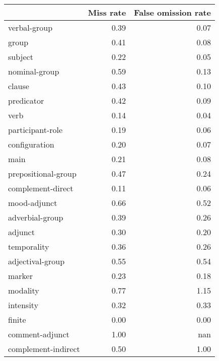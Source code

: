 \begin{table}[!ht]
\centering
\begin{tabular}{lrr}
\toprule
{} &  Miss rate &  False omission rate \\
\midrule
verbal-group              &       0.39 &                 0.07 \\
group                     &       0.41 &                 0.08 \\
subject                   &       0.22 &                 0.05 \\
nominal-group             &       0.59 &                 0.13 \\
clause                    &       0.43 &                 0.10 \\
predicator                &       0.42 &                 0.09 \\
verb                      &       0.14 &                 0.04 \\
participant-role          &       0.19 &                 0.06 \\
configuration             &       0.20 &                 0.07 \\
main                      &       0.21 &                 0.08 \\
prepositional-group       &       0.47 &                 0.24 \\
complement-direct         &       0.11 &                 0.06 \\
mood-adjunct              &       0.66 &                 0.52 \\
adverbial-group           &       0.39 &                 0.26 \\
adjunct                   &       0.30 &                 0.20 \\
temporality               &       0.36 &                 0.26 \\
adjectival-group          &       0.55 &                 0.54 \\
marker                    &       0.23 &                 0.18 \\
modality                  &       0.77 &                 1.15 \\
intensity                 &       0.32 &                 0.33 \\
finite                    &       0.00 &                 0.00 \\
comment-adjunct           &       1.00 &                  nan \\
complement-indirect       &       0.50 &                 1.00 \\

\end{tabular}
\end{table}
